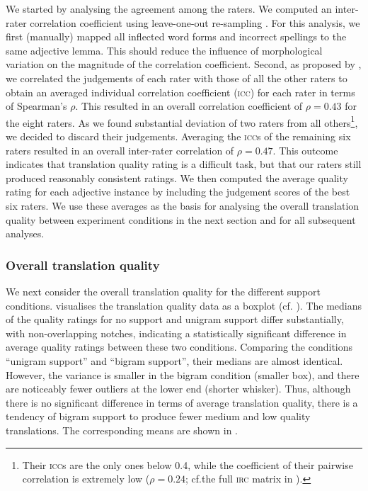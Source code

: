 \documentclass[output=paper]{LSP/langsci}
\begin{document}
We started by analysing the agreement among the raters. We computed an
inter-rater correlation coefficient using leave-one-out re-sampling
\citep{WeissKulikowski:1991}. For this analysis, we first (manually)
mapped all inflected word forms and incorrect spellings to the same
adjective lemma. This should reduce the influence of morphological
variation on the magnitude of the correlation coefficient.
%
Second, as proposed by \cite{MitchellLapata:2010}, we correlated the
judgements of each rater with those of all the other raters to obtain
an averaged individual correlation coefficient (\textsc{icc}) for each
rater in terms of Spearman's $\rho$. This resulted in an overall
correlation coefficient of $\rho=0.43$ for the eight raters. As we
found substantial deviation of two raters from all
others\footnote{Their \textsc{icc}s are the only ones below 0.4, while
  the coefficient of their pairwise correlation is extremely low
  ($\rho=0.24$; cf.\@ the full \textsc{irc} matrix in
  ).}, we decided to discard their
judgements. Averaging the \textsc{icc}s of the remaining six raters
resulted in an overall inter-rater correlation of $\rho=0.47$. This
outcome indicates that translation quality rating is a difficult task,
but that our raters still produced reasonably consistent ratings. We
then computed the average quality rating for each adjective instance
by including the judgement scores of the best six raters.  We use
these averages as the basis for analysing the overall translation
quality between experiment conditions in the next section and for all
subsequent analyses.


\subsubsection{Overall translation quality}
\label{sec:kremer:overall-translation-quality}

We next consider the overall translation quality for the different
support conditions.  visualises the
translation quality data as a boxplot (cf. ). The medians of the quality
ratings for no support and unigram support differ
substantially, with non-overlapping notches, indicating a
statistically significant difference in average quality ratings
between these two conditions.
%
Comparing the conditions ``unigram support'' and ``bigram support'', their
medians are almost identical. However, the variance is smaller in the
bigram condition (smaller box), and there are noticeably fewer
outliers at the lower end (shorter whisker). Thus, although there is
no significant difference in terms of average translation quality,
there is a tendency of bigram support to produce fewer medium and low
quality translations. The corresponding means are shown in
.
\end{document}

